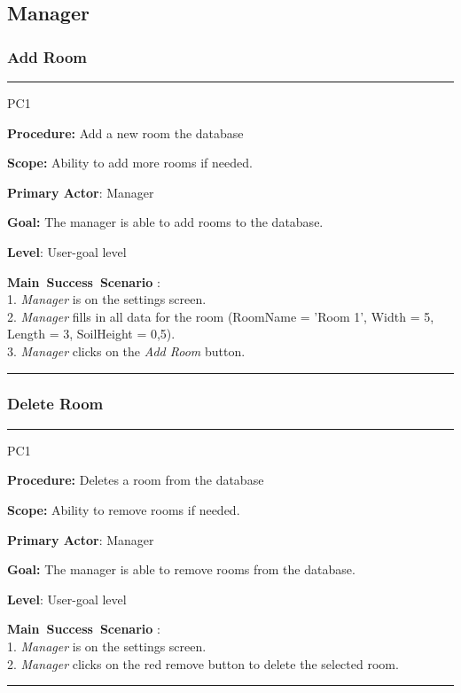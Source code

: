 \subsection{Manager}
\subsubsection{Add Room}

\vspace{0.5cm}
\hrule
\hfill \break
\begin{lyxlist}{PC1}
\small{
\item [\textbf{Procedure:}] Add a new room the database
\item [\textbf{Scope:}] Ability to add more rooms if needed.
\item [\textbf{Primary Actor}:] Manager
\item [\textbf{Goal:}] The manager is able to add rooms to the database.
\item [\textbf{Level}:] User-goal level
\item [\textbf{Main~Success~Scenario}]:\\
1. \emph{Manager} is on the settings screen. \\
2. \emph{Manager} fills in all data for the room (RoomName = 'Room 1', Width
= 5, Length = 3, SoilHeight = 0,5).\\
3. \emph{Manager} clicks on the \emph{Add Room} button.
}
\end{lyxlist}
\hrule
\vspace{0.5cm}

\subsubsection{Delete Room}

\vspace{0.5cm}
\hrule
\hfill \break
\begin{lyxlist}{PC1}
\small{
\item [\textbf{Procedure:}] Deletes a room from the database
\item [\textbf{Scope:}] Ability to remove rooms if needed.
\item [\textbf{Primary Actor}:] Manager
\item [\textbf{Goal:}] The manager is able to remove rooms from the database.
\item [\textbf{Level}:] User-goal level
\item [\textbf{Main~Success~Scenario}]:\\
1. \emph{Manager} is on the settings screen. \\
2. \emph{Manager} clicks on the red remove button to delete the selected room.
}
\end{lyxlist}
\hrule
\vspace{0.5cm}
\break




